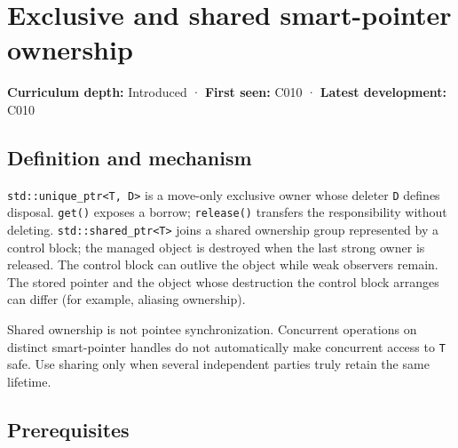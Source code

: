 \hypertarget{appendix-51602cabe815}{}\label{referencestart:appendix-51602cabe815}
\section{Exclusive and shared smart-pointer ownership}\label{appendix-51602cabe815-exclusive-and-shared-smart-pointer-ownership}

\hypertarget{appendix-51602cabe815-exclusive-and-shared-smart-pointer-ownership}{}

\textbf{Curriculum depth:} Introduced · \textbf{First seen:} C010 · \textbf{Latest development:} C010

\begin{allmightroledefinition}

\subsection{Definition and mechanism}\label{appendix-51602cabe815-definition-and-mechanism}

\hypertarget{appendix-51602cabe815-definition-and-mechanism}{}

\texttt{std::unique\_ptr\textless{}T,\ D\textgreater{}} is a move-only exclusive owner whose deleter \texttt{D} defines disposal. \texttt{get()} exposes a borrow; \texttt{release()} transfers the responsibility without deleting. \texttt{std::shared\_ptr\textless{}T\textgreater{}} joins a shared ownership group represented by a control block; the managed object is destroyed when the last strong owner is released. The control block can outlive the object while weak observers remain. The stored pointer and the object whose destruction the control block arranges can differ (for example, aliasing ownership).

\end{allmightroledefinition}

Shared ownership is not pointee synchronization. Concurrent operations on distinct smart-pointer handles do not automatically make concurrent access to \texttt{T} safe. Use sharing only when several independent parties truly retain the same lifetime.

\subsection{Prerequisites}\label{appendix-51602cabe815-prerequisites}

\hypertarget{appendix-51602cabe815-prerequisites}{}

